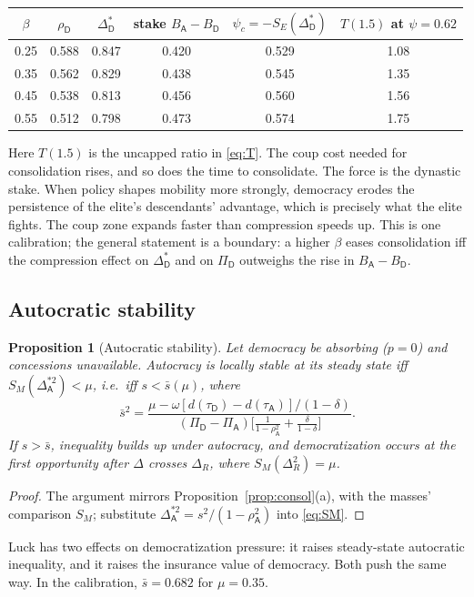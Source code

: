 \documentclass[11pt]{article}
\newtheorem{proposition}{Proposition}
\theoremstyle{remark}
\newcommand{\A}{\mathsf{A}}
\newcommand{\D}{\mathsf{D}}
\begin{document}
\begin{center}
\begin{tabular}{cccccc}
\toprule
$\beta$ & $\rho_\D$ & $\Delta^*_\D$ & stake $B_\A-B_\D$ & $\psi_c=-S_E(\Delta^*_\D)$ & $T(1.5)$ at $\psi=0.62$\\
\midrule
0.25 & 0.588 & 0.847 & 0.420 & 0.529 & 1.08\\
0.35 & 0.562 & 0.829 & 0.438 & 0.545 & 1.35\\
0.45 & 0.538 & 0.813 & 0.456 & 0.560 & 1.56\\
0.55 & 0.512 & 0.798 & 0.473 & 0.574 & 1.75\\
\bottomrule
\end{tabular}
\end{center}
Here $T(1.5)$ is the uncapped ratio in \eqref{eq:T}.  The coup cost needed for consolidation rises, and so does the time to consolidate.  The force is the dynastic stake.  When policy shapes mobility more strongly, democracy erodes the persistence of the elite's descendants' advantage, which is precisely what the elite fights.  The coup zone expands faster than compression speeds up.  This is one calibration; the general statement is a boundary: a higher $\beta$ eases consolidation iff the compression effect on $\Delta^*_\D$ and on $\Pi_\D$ outweighs the rise in $B_\A-B_\D$.

\subsection{Autocratic stability}

\begin{proposition}[Autocratic stability]\label{prop:auto}
Let democracy be absorbing ($p=0$) and concessions unavailable.  Autocracy is locally stable at its steady state iff $S_M(\Delta^{*2}_\A)<\mu$, i.e.\ iff $s<\bar s(\mu)$, where
\begin{equation}
\bar s^2=\frac{\mu-\omega[d(\tau_\D)-d(\tau_\A)]/(1-\delta)}{(\Pi_\D-\Pi_\A)\big[\tfrac{1}{1-\rho_\A^2}+\tfrac{\delta}{1-\delta}\big]}.
\label{eq:sbar}
\end{equation}
If $s>\bar s$, inequality builds up under autocracy, and democratization occurs at the first opportunity after $\Delta$ crosses $\Delta_R$, where $S_M(\Delta_R^2)=\mu$.
\end{proposition}
\begin{proof}
The argument mirrors Proposition~\ref{prop:consol}(a), with the masses' comparison $S_M$; substitute $\Delta^{*2}_\A=s^2/(1-\rho_\A^2)$ into \eqref{eq:SM}.
\end{proof}
Luck has two effects on democratization pressure: it raises steady-state autocratic inequality, and it raises the insurance value of democracy.  Both push the same way.  In the calibration, $\bar s=0.682$ for $\mu=0.35$.
\end{document}
